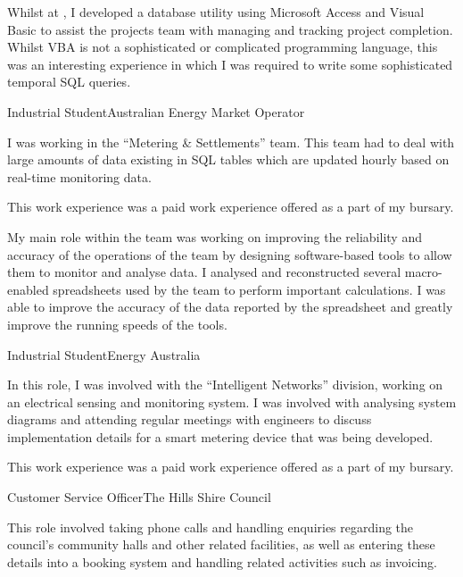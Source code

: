 \documentclass[10pt]{article}
\begin{document}
\begin{professionalExperience}
{Whilst at , I developed a database utility using 
Microsoft Access and Visual Basic to assist the projects team with managing and 
tracking project completion. Whilst VBA is not a sophisticated or complicated
programming language, this was an interesting experience in which I was required
to write some sophisticated temporal SQL queries.}
{
    
}

{Industrial Student}{Australian Energy Market Operator}
{I was working in the ``Metering \& Settlements'' team. This team had to deal 
with large amounts of data existing in SQL tables which are updated hourly based 
on real-time monitoring data.

This work experience was a paid work experience offered as a part of my 
 bursary.

My main role within the team was working on improving the reliability and 
accuracy of the operations of the team by designing software-based tools to 
allow them to monitor and analyse data. I analysed and reconstructed several 
macro-enabled spreadsheets used by the team to perform important calculations. I
was able to improve the accuracy of the data reported by the spreadsheet and 
greatly improve the running speeds of the tools.}
{
    
}

{Industrial Student}{Energy Australia}
{In this role, I was involved with the ``Intelligent Networks'' division, 
working on an electrical sensing and monitoring system. I was involved with 
analysing system diagrams and attending regular meetings with engineers to 
discuss implementation details for a smart metering device that was being 
developed.

This work experience was a paid work experience offered as a part of my 
 bursary.}
{}

{Customer Service Officer}{The Hills Shire Council}
{This role involved taking phone calls and handling enquiries regarding the 
council's community halls and other related facilities, as well as entering 
these details into a booking system and handling related activities such as 
invoicing.

}
\end{professionalExperience}
\end{document}
